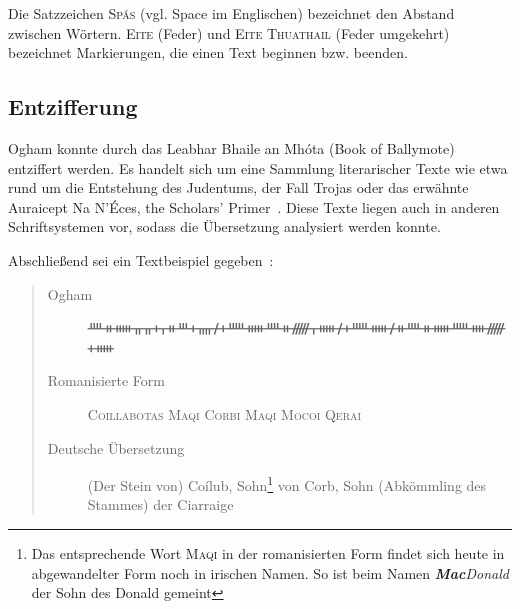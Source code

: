 \documentclass[a4paper]{scrartcl}
\newcommand{\character}[1]{\textsc{#1}}
\begin{document}
Die Satzzeichen \character{Spás} (vgl. \glqq Space\grqq{} im Englischen) bezeichnet den Abstand zwischen Wörtern. \character{Eite} (Feder) und \character{Eite Thuathail} (Feder umgekehrt) bezeichnet Markierungen, die einen Text beginnen bzw. beenden. 

\subsection{Entzifferung}
%
Ogham konnte durch das \glqq Leabhar Bhaile an Mhóta\grqq{} (\glqq Book of Ballymote\grqq) entziffert werden. Es handelt sich um eine Sammlung literarischer Texte wie etwa rund um die Entstehung des Judentums, der Fall Trojas oder das erwähnte \glqq Auraicept Na N'{\'E}ces, the Scholars' Primer\grqq{}~\cite{ballymote}. Diese Texte liegen auch in anderen Schriftsystemen vor, sodass die Übersetzung analysiert werden konnte.

Abschließend sei ein Textbeispiel gegeben~\cite{ogham-wiki-de}:
\begin{quote}
  \begin{description}
    \item[Ogham] {\oghamfont ᚉᚑᚔᚂᚂᚐᚁᚑᚈᚐᚄᚋᚐᚊᚔᚉᚑᚏᚁᚔᚋᚐᚊᚔᚋᚑᚉᚑᚔᚊᚓᚏᚐᚔ}
    \item[Romanisierte Form] \textsc{Coillabotas Maqi Corbi Maqi Mocoi Qerai}
    \item[Deutsche Übersetzung] {\glqq(Der Stein von) Coílub, Sohn\footnote{Das entsprechende Wort \textsc{Maqi} in der romanisierten Form findet sich heute in abgewandelter Form noch in irischen Namen. So ist beim Namen \emph{\textbf{Mac}Donald} der {\glqq Sohn des Donald\grqq} gemeint} von Corb, Sohn (Abkömmling des Stammes) der Ciarraige\grqq}
  \end{description}
\end{quote}
\end{document}
